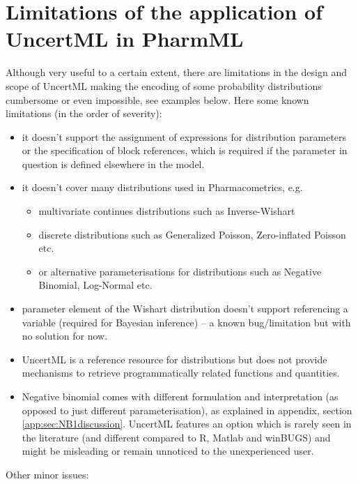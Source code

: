 \section{Limitations of the application of UncertML in PharmML}
\label{sec:uncertmlLimits}
Although very useful to a certain extent, there are limitations in
the design and scope of UncertML making the encoding of some 
probability distributions cumbersome or even impossible, see examples below. 
Here some known limitations (in the order of severity):
\begin{itemize}
\item
it doesn't support the assignment of expressions for distribution parameters or 
the specification of block references, which is required if the parameter in question 
is defined elsewhere in the model. 
\item
it doesn't cover many distributions used in Pharmacometrics, e.g. 
\begin{itemize}
\item 
multivariate continues distributions such as Inverse-Wishart
\item
discrete distributions such as Generalized Poisson, Zero-inflated Poisson etc.
\item
or alternative parameterisations for distributions such as Negative Binomial, 
Log-Normal etc.
\end{itemize}
\item
{} parameter element of the Wishart distribution doesn't support
referencing a variable (required for Bayesian inference) -- a known bug/limitation 
but with no solution for now.
\item
UncertML is a reference resource for distributions but does not provide 
mechanisms to retrieve programmatically related functions and
quantities.  
\item
Negative binomial comes with different formulation and interpretation 
(as opposed to just different parameterisation), as explained in appendix, 
section \ref{app:sec:NB1discussion}. UncertML features an option which is 
rarely seen in the literature (and different compared to R, Matlab and winBUGS) 
and might be misleading or remain unnoticed to the unexperienced user.
\end{itemize}
Other minor issues:
